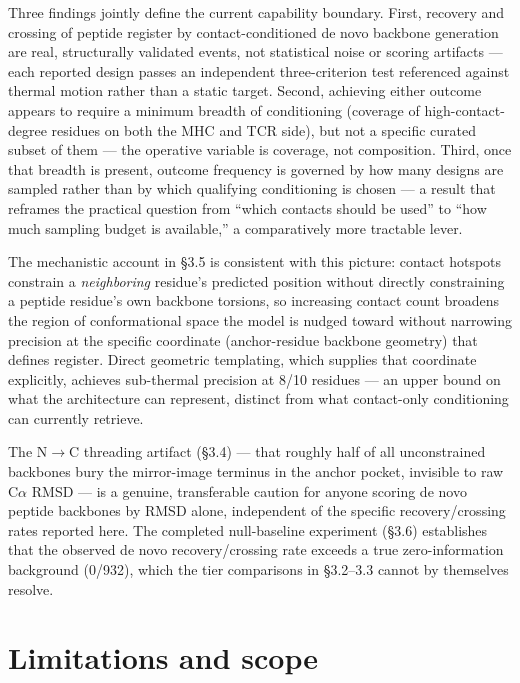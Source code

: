 \documentclass[letterpaper]{article}
\begin{document}
Three findings jointly define the current capability boundary. First, recovery and crossing of peptide
register by contact-conditioned de novo backbone generation are real, structurally validated events, not
statistical noise or scoring artifacts --- each reported design passes an independent three-criterion test
referenced against thermal motion rather than a static target. Second, achieving either outcome appears to
require a minimum breadth of conditioning (coverage of high-contact-degree residues on both the MHC and
TCR side), but not a specific curated subset of them --- the operative variable is coverage, not
composition. Third, once that breadth is present, outcome frequency is governed by how many designs are
sampled rather than by which qualifying conditioning is chosen --- a result that reframes the practical
question from ``which contacts should be used'' to ``how much sampling budget is available,'' a
comparatively more tractable lever.

The mechanistic account in \S3.5 is consistent with this picture: contact hotspots constrain a
\textit{neighboring} residue's predicted position without directly constraining a peptide residue's own
backbone torsions, so increasing contact count broadens the region of conformational space the model is
nudged toward without narrowing precision at the specific coordinate (anchor-residue backbone geometry)
that defines register. Direct geometric templating, which supplies that coordinate explicitly, achieves
sub-thermal precision at 8/10 residues --- an upper bound on what the architecture can represent, distinct
from what contact-only conditioning can currently retrieve.

The N$\rightarrow$C threading artifact (\S3.4) --- that roughly half of all unconstrained backbones bury
the mirror-image terminus in the anchor pocket, invisible to raw C$\alpha$ RMSD --- is a genuine,
transferable caution for anyone scoring de novo peptide backbones by RMSD alone, independent of the
specific recovery/crossing rates reported here. The completed null-baseline experiment (\S3.6) establishes
that the observed de novo recovery/crossing rate exceeds a true zero-information background (0/932), which
the tier comparisons in \S3.2--3.3 cannot by themselves resolve.

\section{Limitations and scope}
\end{document}
